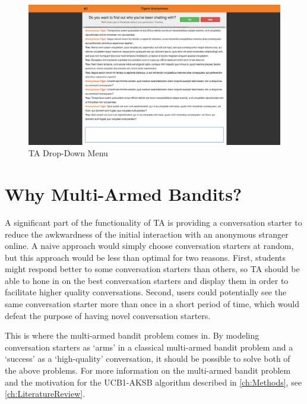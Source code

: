 \begin{figure}[h]
\centering
\includegraphics[trim= 120mm 0mm 120mm 0mm, clip, scale=0.36]{./Figures/FullChatDropDown}
\caption{TA Drop-Down Menu}
\label{fig:DropDownMenu}
\end{figure}

\section{Why Multi-Armed Bandits?}
\label{sec:WhyMultiArmedBandits}
A significant part of the functionality of TA is providing a conversation starter to reduce the awkwardness of the initial interaction with an anonymous stranger online. A naive approach would simply choose conversation starters at random, but this approach would be less than optimal for two reasons. First, students might respond better to some conversation starters than others, so TA should be able to hone in on the best conversation starters and display them in order to facilitate higher quality conversations. Second, users could potentially see the same conversation starter more than once in a short period of time, which would defeat the purpose of having novel conversation starters.

This is where the multi-armed bandit problem comes in. By modeling conversation starters as `arms' in a classical multi-armed bandit problem and a `success' as a `high-quality' conversation, it should be possible to solve both of the above problems. For more information on the multi-armed bandit problem and the motivation for the UCB1-AKSB algorithm described in \autoref{ch:Methods}, see \autoref{ch:LiteratureReview}.
